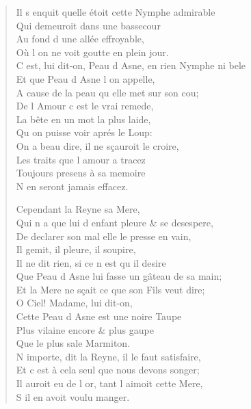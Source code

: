 \begin{verse}
Il s\textquotesingle{} enquit quelle étoit cette Nymphe admirable \\
\vin Qui demeuroit dans une bassecour \\
\vin Au fond d\textquotesingle{} une allée effroyable, \\
\vin Où l\textquotesingle{} on ne voit goutte en plein jour. \\
C\textquotesingle{} est, lui dit-on, Peau d\textquotesingle{} Asne, en rien Nymphe ni bele \\
\vin Et que Peau d\textquotesingle{} Asne l\textquotesingle{} on appelle, \\
A cause de la peau qu\textquotesingle{} elle met sur son cou; \\
\vin De l\textquotesingle{} Amour c\textquotesingle{} est le vrai remede, \\
\vin La bête en un mot la plus laide, \\
\vin Qu\textquotesingle{} on puisse voir aprés le Loup: \\
\vin On a beau dire, il ne sçauroit le croire, \\
\vin Les traits que l\textquotesingle{} amour a tracez \\
\vin Toujours presens à sa memoire \\
\vin N\textquotesingle{} en seront jamais effacez.

\vin Cependant la Reyne sa Mere, \\
Qui n\textquotesingle{} a que lui d\textquotesingle{} enfant pleure \& se desespere, \\
De declarer son mal elle le presse en vain, \\
\vin Il gemit, il pleure, il soupire, \\
\vin Il ne dit rien, si ce n\textquotesingle{} est qu\textquotesingle{} il desire \\
Que Peau d\textquotesingle{} Asne lui fasse un gâteau de sa main; \\
Et la Mere ne sçait ce que son Fils veut dire; \\
\vin O Ciel! Madame, lui dit-on, \\
\vin Cette Peau d\textquotesingle{} Asne est une noire Taupe \\
\vin Plus vilaine encore \& plus gaupe \\
\vin Que le plus sale Marmiton. \\
N\textquotesingle{} importe, dit la Reyne, il le faut satisfaire, \\
Et c\textquotesingle{} est à cela seul que nous devons songer; \\
Il auroit eu de l\textquotesingle{} or, tant l\textquotesingle{} aimoit cette Mere, \\
\vin S\textquotesingle{} il en avoit voulu manger.


\end{verse}
